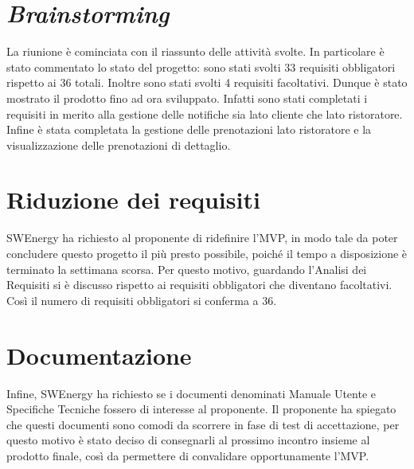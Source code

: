 \section{\textit{Brainstorming}}

La riunione è cominciata con il riassunto delle attività svolte. In particolare
è stato commentato lo stato del progetto: sono stati svolti 33 requisiti
obbligatori rispetto ai 36 totali. Inoltre sono stati svolti 4 requisiti
facoltativi. Dunque è stato mostrato il prodotto fino ad ora sviluppato. Infatti
sono stati completati i requisiti in merito alla gestione delle notifiche sia
lato cliente che lato ristoratore. Infine è stata completata la gestione delle
prenotazioni lato ristoratore e la visualizzazione delle prenotazioni di
dettaglio.

\section{Riduzione dei requisiti}

SWEnergy ha richiesto al proponente di ridefinire l'MVP, in modo tale da poter
concludere questo progetto il più presto possibile, poiché il tempo a
disposizione è terminato la settimana scorsa. Per questo motivo, guardando
l'Analisi dei Requisiti si è discusso rispetto ai requisiti obbligatori che 
diventano facoltativi. Così il numero di requisiti obbligatori si conferma a 36.

\section{Documentazione}

Infine, SWEnergy ha richiesto se i documenti denominati Manuale Utente e
Specifiche Tecniche fossero di interesse al proponente. Il proponente ha
spiegato che questi documenti sono comodi da scorrere in fase di test di
accettazione, per questo motivo è stato deciso di consegnarli al prossimo
incontro insieme al prodotto finale, così da permettere di convalidare
opportunamente l'MVP.
